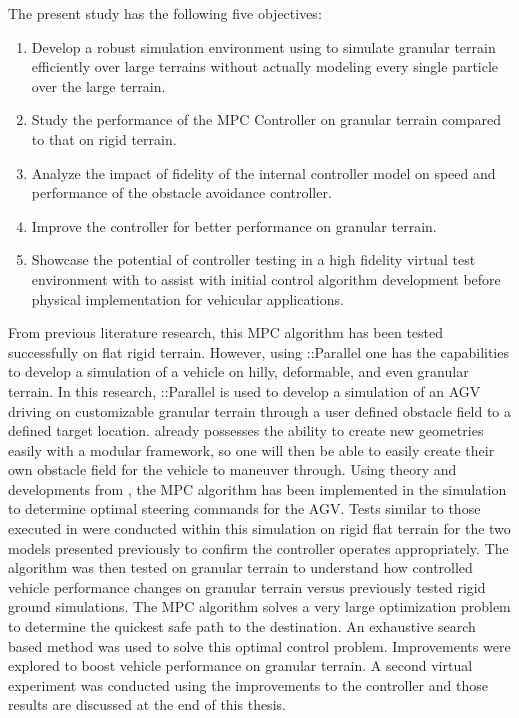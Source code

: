 \documentclass[12pt,onecolumn]{report}
\newcommand{\CHRONO}{{\sffamily{{Chrono}}}}
\newcommand{\ChronoParallel}{{\sffamily{Chrono}}::Parallel}
\begin{document}
The present study has the following five objectives:
\begin{enumerate}
\item
Develop a robust simulation environment using {\CHRONO} to simulate granular terrain efficiently over large terrains without actually modeling every single particle over the large terrain.
\item
Study the performance of the MPC Controller on granular terrain compared to that on rigid terrain.
\item
Analyze the impact of fidelity of the internal controller model on speed and performance of the obstacle avoidance controller.
\item
Improve the controller for better performance on granular terrain.
\item
Showcase the potential of controller testing in a high fidelity virtual test environment with {\CHRONO} to assist with initial control algorithm development before physical implementation for vehicular applications.
\end{enumerate}

From previous literature research, this MPC algorithm has been tested successfully on flat rigid terrain. However, using {\ChronoParallel} one has the capabilities to develop a simulation of a vehicle on hilly, deformable, and even granular terrain. In this research, {\ChronoParallel} is used to develop a simulation of an AGV driving on customizable granular terrain through a user defined obstacle field to a defined target location. {\CHRONO} already possesses the ability to create new geometries easily with a modular framework, so one will then be able to easily create their own obstacle field for the vehicle to maneuver through. Using theory and developments from \cite{ModelFidelity2016}, the MPC algorithm has been implemented in the simulation to determine optimal steering commands for the AGV. Tests similar to those executed in \cite{ModelFidelity2016} were conducted within this simulation on rigid flat terrain for the two models presented previously to confirm the controller operates appropriately. The algorithm was then tested on granular terrain to understand how controlled vehicle performance changes on granular terrain versus previously tested rigid ground simulations. The MPC algorithm solves a very large optimization problem to determine the quickest safe path to the destination. An exhaustive search based method was used to solve this optimal control problem. Improvements were explored to boost vehicle performance on granular terrain. A second virtual experiment was conducted using the improvements to the controller and those results are discussed at the end of this thesis.
\end{document}
